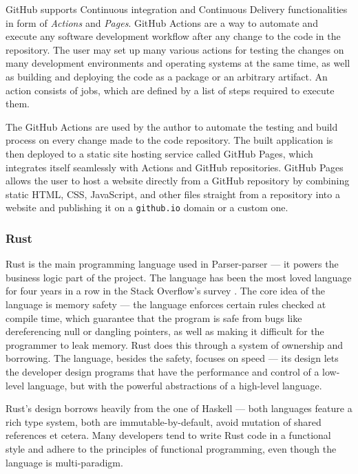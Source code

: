 \documentclass[english,bachelors,forcepolishlogotype]{wizthesis}
\newcommand{\thisproject}{Parser-parser}
\begin{document}
GitHub supports Continuous integration and Continuous Delivery functionalities
in form of \emph{Actions} and \emph{Pages}. GitHub Actions are a way to automate
and execute any software development workflow after any change to the code in
the repository. The user may set up many various actions for testing the changes
on many development environments and operating systems at the same time, as well
as building and deploying the code as a package or an arbitrary artifact. An
action consists of jobs, which are defined by a list of steps required to
execute them.

The GitHub Actions are used by the author to automate the testing and build
process on every change made to the code repository. The built application is
then deployed to a static site hosting service called GitHub Pages, which
integrates itself seamlessly with Actions and GitHub repositories. GitHub Pages
allows the user to host a website directly from a GitHub repository by combining
static HTML, CSS, JavaScript, and other files straight from a repository into
a website and publishing it on a \texttt{github.io} domain or a custom one.

\subsubsection*{Rust}

Rust \cite{rust} is the main programming language used in \thisproject{} --- it
powers the business logic part of the project. The language has been the most
loved language for four years in a row in the Stack Overflow's survey
\cite{stack-overflow-insights-2019}. The core idea of the language is memory
safety --- the language enforces certain rules checked at compile time, which
guarantee that the program is safe from bugs like dereferencing null or dangling
pointers, as well as making it difficult for the programmer to leak memory. Rust
does this through a system of ownership and borrowing. The language, besides the
safety, focuses on speed --- its design lets the developer design programs that
have the performance and control of a low-level language, but with the powerful
abstractions of a high-level language.

Rust's design borrows heavily from the one of Haskell \cite{haskell} --- both
languages feature a rich type system, both are immutable-by-default, avoid
mutation of shared references et cetera. Many developers tend to write Rust code
in a functional style and adhere to the principles of functional programming,
even though the language is multi-paradigm.
\end{document}
